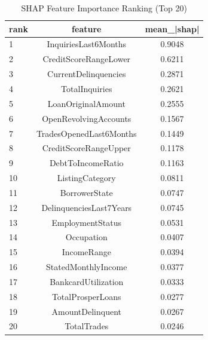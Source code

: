 \begin{table}
\centering
\caption{SHAP Feature Importance Ranking (Top 20)}
\label{tab:shap_ranking}
\begin{tabular}{lcc}
\toprule
rank & feature & mean_|shap| \\
\midrule
1 & InquiriesLast6Months & 0.9048 \\
2 & CreditScoreRangeLower & 0.6211 \\
3 & CurrentDelinquencies & 0.2871 \\
4 & TotalInquiries & 0.2621 \\
5 & LoanOriginalAmount & 0.2555 \\
6 & OpenRevolvingAccounts & 0.1567 \\
7 & TradesOpenedLast6Months & 0.1449 \\
8 & CreditScoreRangeUpper & 0.1178 \\
9 & DebtToIncomeRatio & 0.1163 \\
10 & ListingCategory & 0.0811 \\
11 & BorrowerState & 0.0747 \\
12 & DelinquenciesLast7Years & 0.0745 \\
13 & EmploymentStatus & 0.0531 \\
14 & Occupation & 0.0407 \\
15 & IncomeRange & 0.0394 \\
16 & StatedMonthlyIncome & 0.0377 \\
17 & BankcardUtilization & 0.0333 \\
18 & TotalProsperLoans & 0.0277 \\
19 & AmountDelinquent & 0.0267 \\
20 & TotalTrades & 0.0246 \\
\bottomrule
\end{tabular}
\end{table}

